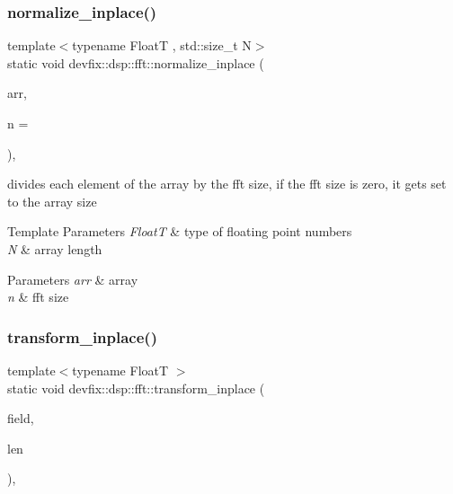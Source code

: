 \subsubsection{\texorpdfstring{normalize\+\_\+inplace()}{normalize\_inplace()}\hspace{0.1cm}{\footnotesize\ttfamily [3/3]}}
{\footnotesize\ttfamily template$<$typename FloatT , std\+::size\+\_\+t N$>$ \\
static void devfix\+::dsp\+::fft\+::normalize\+\_\+inplace (\begin{DoxyParamCaption}\item[{std\+::array$<$ std\+::complex$<$ FloatT $>$, N $>$ \&}]{arr,  }\item[{std\+::size\+\_\+t}]{n = {} }\end{DoxyParamCaption})\hspace{0.3cm}{\ttfamily [inline]}, {\ttfamily [static]}}



divides each element of the array by the fft size, if the fft size is zero, it gets set to the array size 


\begin{DoxyTemplParams}{Template Parameters}
{\em FloatT} & type of floating point numbers \\
\hline
{\em N} & array length \\
\hline
\end{DoxyTemplParams}

\begin{DoxyParams}{Parameters}
{\em arr} & array \\
\hline
{\em n} & fft size \\
\hline
\end{DoxyParams}
\mbox{\label{structdevfix_1_1dsp_1_1fft_a8e6e4580cc075ebaa7be5d2781a8e3eb}} 
\subsubsection{\texorpdfstring{transform\+\_\+inplace()}{transform\_inplace()}\hspace{0.1cm}{\footnotesize\ttfamily [1/3]}}
{\footnotesize\ttfamily template$<$typename FloatT $>$ \\
static void devfix\+::dsp\+::fft\+::transform\+\_\+inplace (\begin{DoxyParamCaption}\item[{std\+::complex$<$ FloatT $>$ $\ast$}]{field,  }\item[{std\+::size\+\_\+t}]{len }\end{DoxyParamCaption})\hspace{0.3cm}{\ttfamily [inline]}, {\ttfamily [static]}}



